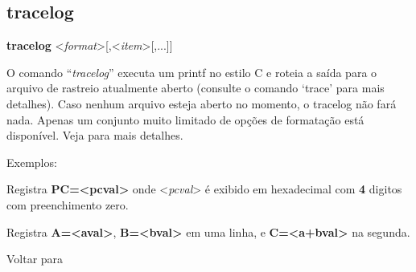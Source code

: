 \documentclass[letterpaper,10pt,brazil]{sphinxmanual}
\begin{document}
\subsection{tracelog}
\label{debugger/general:debugger-command-tracelog}\label{debugger/general:tracelog}
\begin{DUlineblock}{0em}
\item[]
\begin{DUlineblock}{\DUlineblockindent}
\item[] \textbf{tracelog} \textless{}\emph{format}\textgreater{}{[},\textless{}\emph{item}\textgreater{}{[},...{]}{]}
\item[] 
\end{DUlineblock}
\item[] O comando ``\emph{tracelog}'' executa um printf no estilo C e roteia a saída para o arquivo de rastreio atualmente aberto (consulte o comando `trace' para mais detalhes). Caso nenhum arquivo esteja aberto no momento, o tracelog não fará nada. Apenas um conjunto muito limitado de opções de formatação está disponível. Veja {\hyperref[debugger/general:debugger\string-command\string-printf]{}} para mais detalhes.
\item[] 
\item[] Exemplos:
\item[] 
\item[]
\begin{DUlineblock}{\DUlineblockindent}
\item[] 
\item[] 
\end{DUlineblock}
\item[] Registra \textbf{PC=\textless{}pcval\textgreater{}} onde \textless{}\emph{pcval}\textgreater{} é exibido em hexadecimal com \textbf{4} digitos com preenchimento zero.
\item[] 
\item[]
\begin{DUlineblock}{\DUlineblockindent}
\item[] 
\item[] 
\end{DUlineblock}
\item[] Registra \textbf{A=\textless{}aval\textgreater{}}, \textbf{B=\textless{}bval\textgreater{}} em uma linha, e \textbf{C=\textless{}a+bval\textgreater{}} na segunda.
\item[] 
\item[] Voltar para {\hyperref[debugger/general:debugger\string-general\string-list]{}}
\end{DUlineblock}
\begin{quote}
\label{debugger/general:debugger-command-tracesym}\end{quote}
\end{document}
